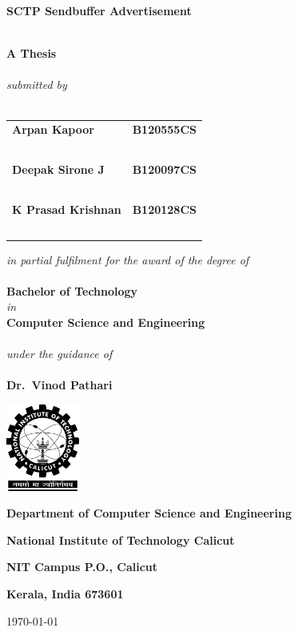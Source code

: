 \begin{titlepage}
  \centering

  {\large \textbf{SCTP Sendbuffer Advertisement}\\~\\}

  \textbf{A Thesis}\\~\\

  \emph{submitted by}\\~\\

  \begin{tabular}{lr}
    \textbf{Arpan Kapoor} & \textbf{B120555CS}\\~\\
    \textbf{Deepak Sirone J} & \textbf{B120097CS}\\~\\
    \textbf{K Prasad Krishnan} & \textbf{B120128CS}\\~\\
  \end{tabular}

  \bigskip
  \emph{in partial fulfilment for the award of the degree of}\\~\\

  \textbf{Bachelor of Technology}\\
  \emph{in}\\
  \textbf{Computer Science and Engineering}\\~\\

  \emph{under the guidance of}\\~\\

  \textbf{Dr.~Vinod Pathari}

  \vfill
  \includegraphics[width=0.18\textwidth]{./nitc-logo.png}

  {\large \textbf{Department of Computer Science and Engineering}\par}
  {\large \textbf{National Institute of Technology Calicut}\par}
  {\large \textbf{NIT Campus P.O., Calicut}\par}
  {\large \textbf{Kerala, India 673601}\par}

  {\today\par}
\end{titlepage}
